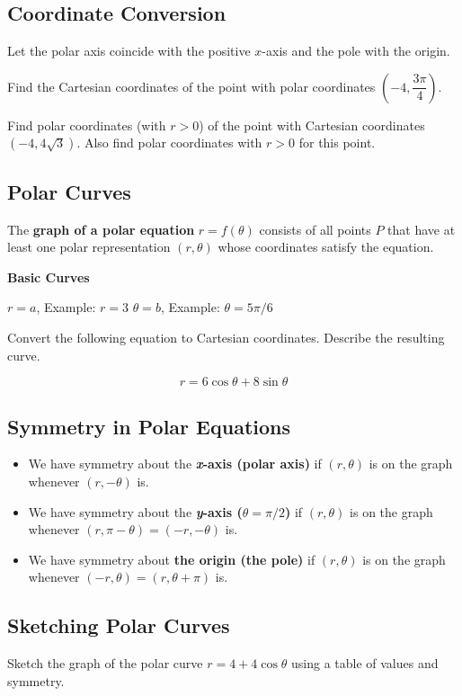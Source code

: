 \documentclass[12pt]{article}
\begin{document}
\subsection*{Coordinate Conversion}

Let the polar axis coincide with the positive $x$-axis and the pole with the origin.

\vfill

\newpage

\Example Find the Cartesian coordinates of the point with polar coordinates $\left(-4,\dfrac{3\pi}{4}\right)$.

\vfill

\Example Find polar coordinates (with $r>0$) of the point with Cartesian coordinates $\left(-4, 4\sqrt{3}\right)$. Also find polar coordinates with $r>0$ for this point.

\vfill

\subsection*{Polar Curves}

The \textbf{graph of a polar equation} $r=f(\theta)$ consists of all points $P$ that have at least one polar representation $(r,\theta)$ whose coordinates satisfy the equation.

\vspace{4mm}

\textbf{Basic Curves}

\vspace{4mm}

$r=a$, Example: $r=3$ \hspace{50mm} $\theta=b$, Example: $\theta=5\pi/6$

\vfill

\newpage

\Example Convert the following equation to Cartesian coordinates. Describe the resulting curve. 

$$r=6\cos\theta+8\sin\theta$$

\vfill

\newpage

\subsection*{Symmetry in Polar Equations}
\begin{itemize}
	\item We have symmetry about the \textbf{\textit{x}-axis (polar axis)} if $(r,\theta)$ is on the graph whenever $(r,-\theta)$ is.
	\item We have symmetry about the \textbf{\textit{y}-axis ($\theta=\pi/2$)} if $(r,\theta)$ is on the graph whenever $(r,\pi-\theta)=(-r,-\theta)$ is.
	\item We have symmetry about \textbf{the origin (the pole)} if $(r,\theta)$ is on the graph whenever $(-r,\theta)=(r,\theta+\pi)$ is. 
\end{itemize}

\vspace{35mm}

\subsection*{Sketching Polar Curves}

\Example Sketch the graph of the polar curve $r=4+4\cos\theta$ using a table of values and symmetry.
\end{document}
